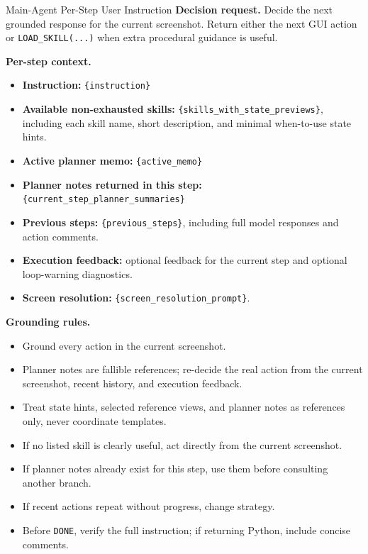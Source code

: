 \begin{promptbox}{Main-Agent Per-Step User Instruction}
\textbf{Decision request.} Decide the next grounded response for the current screenshot. Return either the next GUI action or \texttt{LOAD\_SKILL(...)} when extra procedural guidance is useful.

\medskip
\textbf{Per-step context.}
\begin{itemize}[leftmargin=*, itemsep=0.2em]
    \item \textbf{Instruction:} \texttt{\{instruction\}}
    \item \textbf{Available non-exhausted skills:} \texttt{\{skills\_with\_state\_previews\}}, including each skill name, short description, and minimal when-to-use state hints.
    \item \textbf{Active planner memo:} \texttt{\{active\_memo\}}
    \item \textbf{Planner notes returned in this step:} \texttt{\{current\_step\_planner\_summaries\}}
    \item \textbf{Previous steps:} \texttt{\{previous\_steps\}}, including full model responses and action comments.
    \item \textbf{Execution feedback:} optional feedback for the current step and optional loop-warning diagnostics.
    \item \textbf{Screen resolution:} \texttt{\{screen\_resolution\_prompt\}}.
\end{itemize}

\textbf{Grounding rules.}
\begin{itemize}[leftmargin=*, itemsep=0.2em]
    \item Ground every action in the current screenshot.
    \item Planner notes are fallible references; re-decide the real action from the current screenshot, recent history, and execution feedback.
    \item Treat state hints, selected reference views, and planner notes as references only, never coordinate templates.
    \item If no listed skill is clearly useful, act directly from the current screenshot.
    \item If planner notes already exist for this step, use them before consulting another branch.
    \item If recent actions repeat without progress, change strategy.
    \item Before \texttt{DONE}, verify the full instruction; if returning Python, include concise comments.
\end{itemize}
\end{promptbox}

